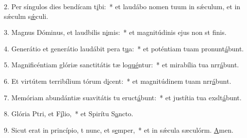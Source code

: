 2. Per síngulos dies bendícam t\uline{i}bi:~* et laudábo nomen tuum in sǽculum, et in sǽculm s\uline{ǽ}culi.\par 
3. Magnus Dóminus, et laudbilis n\uline{i}mis:~* et magnitúdinis ejus non st f\uline{i}nis.\par 
4. Generátio et generátio laudábit pera t\uline{u}a:~* et poténtiam tuam pronunt\uline{á}bunt.\par 
5. Magnificéntiam glóriæ sanctitátis tæ lo\uline{qué}ntur:~* et mirabília tua nrr\uline{á}bunt.\par 
6. Et virtútem terribílium tórum d\uline{i}cent:~* et magnitúdinem tuam nrr\uline{á}bunt.\par 
7. Memóriam abundántiæ suavitátis tu eruct\uline{á}bunt:~* et justítia tua exslt\uline{á}bunt.\par 
8. Glória Ptri, et F\uline{í}lio,~* et Spirítu S\uline{a}ncto.\par 
9. Sicut erat in princípio, t nunc, et s\uline{e}mper,~* et in sǽcula sæculórm. \uline{A}men.\par 
